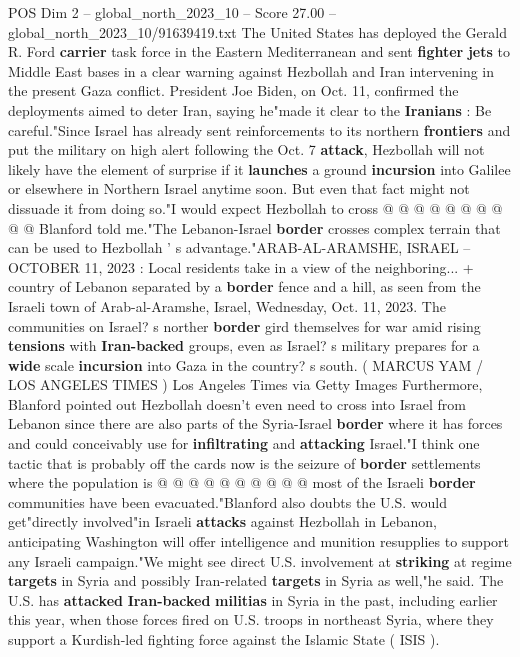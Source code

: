 \begin{textsample}{POS Dim 2 – global\_north\_2023\_10 – Score 27.00 – global\_north\_2023\_10/91639419.txt}
The United States has deployed the Gerald R.
Ford \textbf{carrier} task force in the Eastern Mediterranean and sent \textbf{fighter} \textbf{jets} to Middle East bases in a clear warning against Hezbollah and Iran intervening in the present Gaza conflict.
President Joe Biden, on Oct. 11, confirmed the deployments aimed to deter Iran, saying he"made it clear to the \textbf{Iranians} : Be careful."Since Israel has already sent reinforcements to its northern \textbf{frontiers} and put the military on high alert following the Oct. 7 \textbf{attack}, Hezbollah will not likely have the element of surprise if it \textbf{launches} a ground \textbf{incursion} into Galilee or elsewhere in Northern Israel anytime soon.
But even that fact might not dissuade it from doing so."I would expect Hezbollah to cross @ @ @ @ @ @ @ @ @ @ Blanford told me."The Lebanon-Israel \textbf{border} crosses complex terrain that can be used to Hezbollah ' s advantage."ARAB-AL-ARAMSHE, ISRAEL -- OCTOBER 11, 2023 : Local residents take in a view of the neighboring... + country of Lebanon separated by a \textbf{border} fence and a hill, as seen from the Israeli town of Arab-al-Aramshe, Israel, Wednesday, Oct. 11, 2023.
The communities on Israel? s norther \textbf{border} gird themselves for war amid rising \textbf{tensions} with \textbf{Iran-backed} groups, even as Israel? s military prepares for a \textbf{wide} scale \textbf{incursion} into Gaza in the country? s south. ( MARCUS YAM / LOS ANGELES TIMES ) Los Angeles Times via Getty Images Furthermore, Blanford pointed out Hezbollah doesn't even need to cross into Israel from Lebanon since there are also parts of the Syria-Israel \textbf{border} where it has forces and could conceivably use for \textbf{infiltrating} and \textbf{attacking} Israel."I think one tactic that is probably off the cards now is the seizure of \textbf{border} settlements where the population is @ @ @ @ @ @ @ @ @ @ most of the Israeli \textbf{border} communities have been evacuated."Blanford also doubts the U.S. would get"directly involved"in Israeli \textbf{attacks} against Hezbollah in Lebanon, anticipating Washington will offer intelligence and munition resupplies to support any Israeli campaign."We might see direct U.S. involvement at \textbf{striking} at regime \textbf{targets} in Syria and possibly Iran-related \textbf{targets} in Syria as well,"he said.
The U.S. has \textbf{attacked} \textbf{Iran-backed} \textbf{militias} in Syria in the past, including earlier this year, when those forces fired on U.S. troops in northeast Syria, where they support a Kurdish-led fighting force against the Islamic State ( ISIS ).

\end{textsample}
